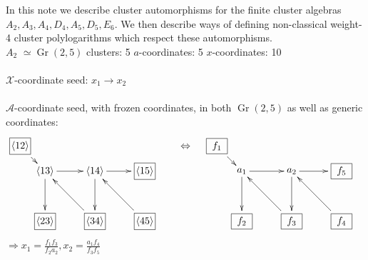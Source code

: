 \documentclass[12pt]{article}
\DeclareMathOperator{\Gr}{Gr}
\def\x{\mathcal{X}}
\def\a{\mathcal{A}}
\begin{document}
\thispagestyle{fancyplain}
 
\fancyhf{}
 
\cfoot{\fancyplain{}{\thepage}}


In this note we describe cluster automorphisms for the finite cluster algebras $A_2, A_3, A_4, D_4, A_5, D_5, E_6$. We then describe ways of defining non-classical weight-4 cluster polylogarithms which respect these automorphisms.\\

{\Huge\underline{\(A_2\)}}  $\simeq\Gr(2,5)$ \quad clusters: 5 \qquad $a$-coordinates: 5 \qquad $x$-coordinates: 10 \\ \\
$\x$-coordinate seed: $x_1 \to x_2$\\ \\
$\a$-coordinate seed, with frozen coordinates, in both $\Gr(2,5)$ as well as generic coordinates: 
\begin{equation}
\begin{gathered}
\begin{xy} 0;<1pt,0pt>:<0pt,-1pt>::
(25,25) *+{\langle 13\rangle} ="0",
(75,25) *+{\langle 14\rangle} ="1",
(125,25) *+{\framebox[5ex]{$\langle 15\rangle$}} ="2",
(125,75) *+{\framebox[5ex]{$\langle 45\rangle$}} ="3",
(75,75) *+{\framebox[5ex]{$\langle 34\rangle$}} ="4",
(25,75) *+{\framebox[5ex]{$\langle 23\rangle$}} ="5",
(0,0) *+{\framebox[5ex]{$\langle 12\rangle$}} ="6",
(145,75) *+{},
"0", {\ar"1"},
"4", {\ar"0"},
"0", {\ar"5"},
"6", {\ar"0"},
"1", {\ar"2"},
"3", {\ar"1"},
"1", {\ar"4"},
\end{xy}\quad\Leftrightarrow\quad
\begin{xy} 0;<1pt,0pt>:<0pt,-1pt>::
(25,25) *+{a_1} ="0",
(75,25) *+{a_2} ="1",
(125,25) *+{\framebox[5ex]{$f_5$}} ="2",
(125,75) *+{\framebox[5ex]{$f_4$}} ="3",
(75,75) *+{\framebox[5ex]{$f_3$}} ="4",
(25,75) *+{\framebox[5ex]{$f_2$}} ="5",
(0,0) *+{\framebox[5ex]{$f_1$}} ="6",
(145,75) *+{},
"0", {\ar"1"},
"4", {\ar"0"},
"0", {\ar"5"},
"6", {\ar"0"},
"1", {\ar"2"},
"3", {\ar"1"},
"1", {\ar"4"},
\end{xy}
\end{gathered}
\end{equation}
$\Rightarrow x_1 = \frac{f_1 f_3}{f_2 a_2}, x_2 = \frac{a_1 f_4}{f_3 f_5}$ 
\end{document}
